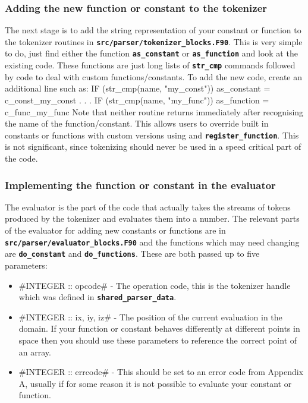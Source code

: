 \documentclass[12pt,a4paper]{article}
\newcommand{\inlinecode}[1]{{\color{warwickred} \bf\texttt{#1}}}
\newenvironment{boxverbatim}{\lboxverbatim{none}}{\endlboxverbatim}
\begin{document}
\subsubsection{Adding the new function or constant to the tokenizer}
The next stage is to add the string representation of your constant or function
to the tokenizer routines in
\inlinecode{src/parser/tokenizer\_blocks.F90}. This is very simple to do, just
find either the function \inlinecode{as\_constant} or \inlinecode{as\_function}
and look at the existing code. These functions are just long lists of
\inlinecode{str\_cmp} commands followed by code to deal with custom
functions/constants. To add the new code, create an additional line such as:
\begin{boxverbatim}
  IF (str_cmp(name, "my_const")) as_constant = c_const_my_const
  .
  .
  .
  IF (str_cmp(name, "my_func"))  as_function = c_func_my_func
\end{boxverbatim}
Note that neither routine returns immediately after recognising the name of the
function/constant. This allows users to override built in constants or
functions with custom versions using\linebreak \inlinecode{register\_constant}
and \inlinecode{register\_function}. This is not significant, since tokenizing
should never be used in a speed critical part of the code.

\subsubsection{Implementing the function or constant in the evaluator}
The evaluator is the part of the code that actually takes the streams of tokens
produced by the tokenizer and evaluates them into a number. The relevant parts
of the evaluator for adding new constants or functions are in
\inlinecode{src/parser/evaluator\_blocks.F90} and the functions which may need
changing are \inlinecode{do\_constant} and \inlinecode{do\_functions}. These are
both passed up to five parameters:
\begin{itemize}
\item #INTEGER :: opcode# - The operation code, this is the tokenizer handle
  which was defined in \inlinecode{shared\_parser\_data}.
\item #INTEGER :: ix, iy, iz# - The position of the current evaluation in the
  domain. If your function or constant behaves differently at different points
  in space then you should use these parameters to reference the correct point
  of an array.
\item #INTEGER :: errcode# - This should be set to an error code from
  Appendix A, usually\linebreak \inlinecode{c\_err\_bad\_value} if for some
  reason it is not possible to evaluate your constant or function.
\end{itemize}
\end{document}
